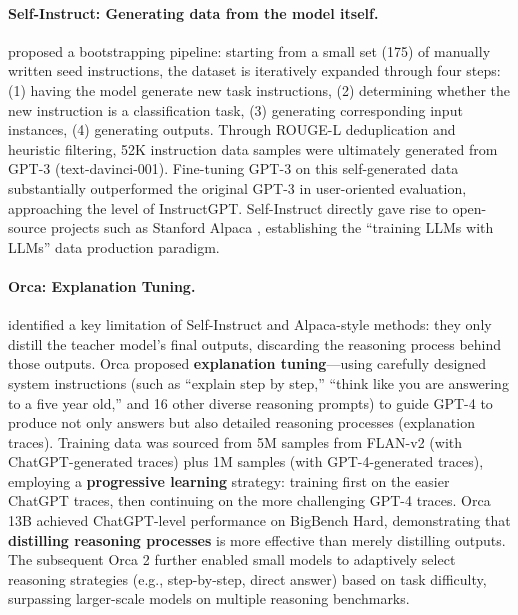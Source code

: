 \paragraph{Self-Instruct: Generating data from the model itself.}
 proposed a bootstrapping pipeline:
starting from a small set (175) of manually written seed instructions,
the dataset is iteratively expanded through four steps:
(1) having the model generate new task instructions,
(2) determining whether the new instruction is a classification task,
(3) generating corresponding input instances,
(4) generating outputs.
Through ROUGE-L deduplication and heuristic filtering,
52K instruction data samples were ultimately generated from GPT-3 (text-davinci-001).
Fine-tuning GPT-3 on this self-generated data substantially outperformed the original GPT-3 in user-oriented evaluation,
approaching the level of InstructGPT.
Self-Instruct directly gave rise to open-source projects such as Stanford Alpaca \cite{taori2023alpaca},
establishing the ``training LLMs with LLMs'' data production paradigm.

\paragraph{Orca: Explanation Tuning.}
 identified a key limitation of Self-Instruct and Alpaca-style methods:
they only distill the teacher model's final outputs,
discarding the reasoning process behind those outputs.
Orca proposed \textbf{explanation tuning}---using carefully designed system instructions (such as ``explain step by step,'' ``think like you are answering to a five year old,'' and 16 other diverse reasoning prompts)
to guide GPT-4 to produce not only answers but also detailed reasoning processes (explanation traces).
Training data was sourced from 5M samples from FLAN-v2 (with ChatGPT-generated traces) plus 1M samples (with GPT-4-generated traces),
employing a \textbf{progressive learning} strategy:
training first on the easier ChatGPT traces, then continuing on the more challenging GPT-4 traces.
Orca 13B achieved ChatGPT-level performance on BigBench Hard,
demonstrating that \textbf{distilling reasoning processes} is more effective than merely distilling outputs.
The subsequent Orca 2 \cite{mitra2023orca2} further enabled small models to adaptively select reasoning strategies (e.g., step-by-step, direct answer) based on task difficulty,
surpassing larger-scale models on multiple reasoning benchmarks.

